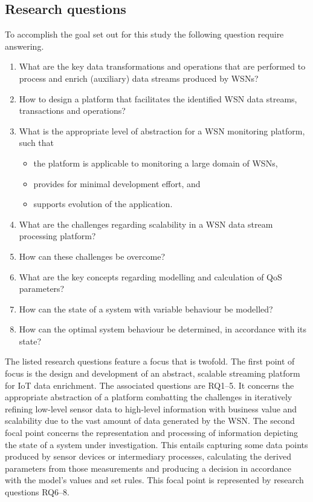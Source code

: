 \subsection{Research questions}
To accomplish the goal set out for this study the following question require answering.
\begin{enumerate}[leftmargin=24pt, label=\small RQ\arabic*]
\nospace
\item\label{rq:identify_processes} What are the key data transformations and operations that are performed to process and enrich (auxiliary) data streams produced by WSNs?
\item\label{rq:desing_processes} How to design a platform that facilitates the identified WSN data streams, transactions and operations?
\item\label{rq:abstraction} What is the appropriate level of abstraction for a WSN monitoring platform, such that
\begin{itemize}
\nospace
\item the platform is applicable to monitoring a large domain of WSNs,
\item provides for minimal development effort, and
\item supports evolution of the application.
\end{itemize}
\item\label{rq:identify_scale} What are the challenges regarding scalability in a WSN data stream processing platform?
\item\label{rq:design_scale} How can these challenges be overcome?
\item\label{rq:idenfity_model} What are the key concepts regarding modelling and calculation of QoS parameters?
\item\label{rq:design_model} How can the state of a system with variable behaviour be modelled?
\item\label{rq:solve_model} How can the optimal system behaviour be determined, in accordance with its state?
\end{enumerate}

The listed research questions feature a focus that is twofold. The first point of focus is the design and development of an abstract, scalable streaming platform for IoT data enrichment. The associated questions are RQ1--5. It concerns the appropriate abstraction of a platform combatting the challenges in iteratively refining low-level sensor data to high-level information with business value and scalability due to the vast amount of data generated by the WSN.  The second focal point concerns the representation and processing of information depicting the state of a system under investigation. This entails capturing some data points produced by sensor devices or intermediary processes, calculating the derived parameters from those measurements and producing a decision in accordance with the model's values and set rules. This focal point is represented by research questions RQ6--8.

